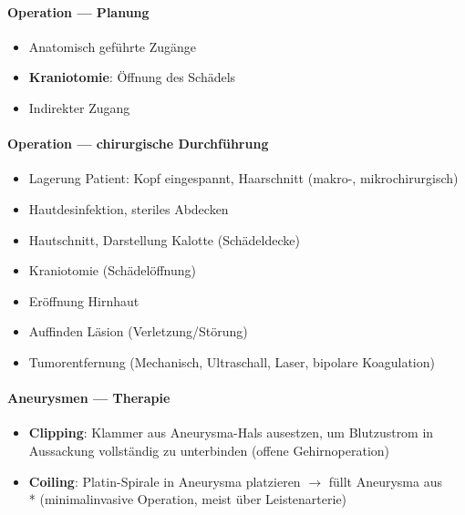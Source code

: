 \paragraph{Operation --- Planung}
\begin{itemize}
  \item Anatomisch geführte Zugänge
  \item \textbf{Kraniotomie}: Öffnung des Schädels
  \item Indirekter Zugang
\end{itemize}

\paragraph{Operation --- chirurgische Durchführung}
\begin{itemize}
  \item Lagerung Patient: Kopf eingespannt, Haarschnitt (makro-, mikrochirurgisch)
  \item Hautdesinfektion, steriles Abdecken
  \item Hautschnitt, Darstellung Kalotte (Schädeldecke)
  \item Kraniotomie (Schädelöffnung)
  \item Eröffnung Hirnhaut
  \item Auffinden Läsion (Verletzung/Störung)
  \item Tumorentfernung (Mechanisch, Ultraschall, Laser, bipolare Koagulation)
\end{itemize}

\paragraph{Aneurysmen --- Therapie}
\begin{itemize}
  \item \textbf{Clipping}: Klammer aus Aneurysma-Hals ausestzen, um Blutzustrom in Aussackung vollständig zu unterbinden (offene Gehirnoperation)
  \item \textbf{Coiling}: Platin-Spirale in Aneurysma platzieren \( \to \) füllt Aneurysma aus \\* (minimalinvasive Operation, meist über Leistenarterie)
\end{itemize}
